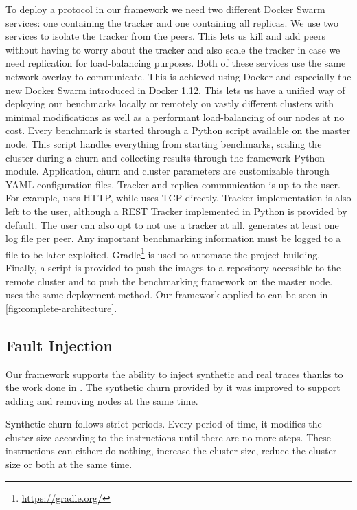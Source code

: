 To deploy a protocol in our framework we need two different Docker Swarm services: one containing the tracker and one containing all replicas. We use two services to isolate the tracker from the peers. This lets us kill and add peers without having to worry about the tracker and also scale the tracker in case we need replication for load-balancing purposes. Both of these services use the same network overlay to communicate. This is achieved using Docker and especially the new Docker Swarm introduced in Docker 1.12. This lets us have a unified way of deploying our benchmarks locally or remotely on vastly different clusters with minimal modifications as well as a performant load-balancing of our nodes at no cost. Every benchmark is started through a Python script available on the master node. This script handles everything from starting benchmarks, scaling the cluster during a churn and collecting results through the framework Python module. Application, churn and cluster  parameters are customizable through YAML configuration files. Tracker and replica communication is up to the user. For example, \epto uses HTTP, while \jgroups uses TCP directly. Tracker implementation is also left to the user, although a REST Tracker implemented in Python is provided by default. The user can also opt to not use a tracker at all. \sys generates at least one log file per peer. Any important benchmarking information must be logged to a file to be later exploited.
Gradle\footnote{\href{https://gradle.org/}{https://gradle.org/}} is used to automate the project building. Finally, a script is provided to push the images to a repository accessible to the remote cluster and to push the benchmarking framework on the master node. \jgroups uses the same deployment method. Our framework applied to \epto can be seen in \autoref{fig:complete-architecture}.
\subsection{Fault Injection}
Our framework supports the ability to inject synthetic and real traces thanks to the work done in \autocite{vaucher2016erasure}. The synthetic churn provided by it was improved to support adding and removing nodes at the same time.

Synthetic churn follows strict periods. Every period of time, it modifies the cluster size according to the instructions until there are no more steps. These instructions can either: do nothing, increase the cluster size, reduce the cluster size or both at the same time.


